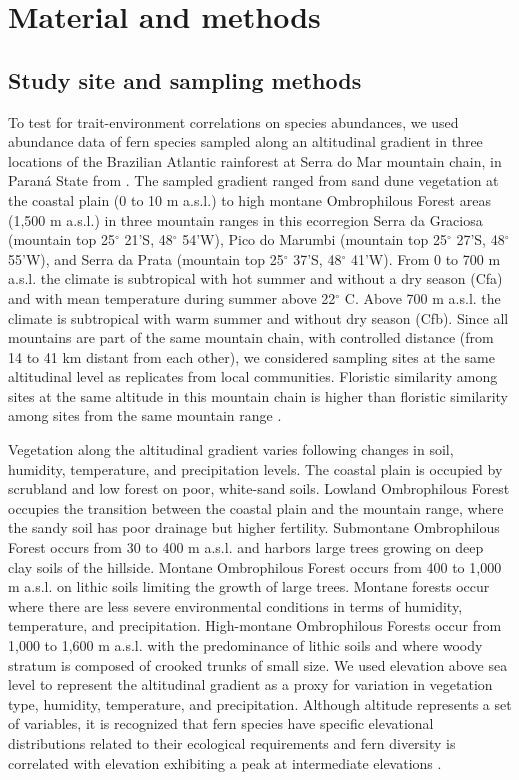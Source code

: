 \documentclass[12pt]{article}
\begin{document}
\section*{Material and methods}

\subsection*{Study site and sampling methods}
To test for trait-environment correlations on species
abundances, we used abundance data of fern species sampled along an
altitudinal gradient in three locations of the Brazilian Atlantic
rainforest at Serra do Mar mountain chain, in Paran\'a State from
\cite{Paciencia2008}.  The sampled gradient ranged from sand dune
vegetation at the coastal plain (0 to 10 m a.s.l.) to high montane
Ombrophilous Forest areas (1,500 m a.s.l.) in three mountain ranges in
this ecorregion Serra da Graciosa (mountain top 25{$^{\circ}$} 21'S,
48{$^{\circ}$} 54'W), Pico do Marumbi (mountain top 25{$^{\circ}$} 27'S,
48{$^{\circ}$} 55'W), and Serra da Prata (mountain top 25{$^{\circ}$} 37'S,
48{$^{\circ}$} 41'W). From 0 to 700 m a.s.l. the climate is
subtropical with hot summer and without a dry season (Cfa) and with
mean temperature during summer above 22{$^{\circ}$} C. Above 700 m
a.s.l. the climate is subtropical with warm summer and without dry
season (Cfb). Since all mountains are part of the same mountain chain,
with controlled distance (from 14 to 41 km distant from each other),
we considered sampling sites at the same altitudinal level as
replicates from local communities.  Floristic similarity
among sites at the same altitude in this mountain chain is higher than
floristic similarity among sites from the same mountain range
\citep{Paciencia2008}.
 
Vegetation along the altitudinal gradient varies following changes in
soil, humidity, temperature, and precipitation levels.  The coastal
plain is occupied by scrubland and low forest on poor, white-sand
soils.  Lowland Ombrophilous Forest occupies the transition between
the coastal plain and the mountain range, where the sandy soil has
poor drainage but higher fertility.  Submontane Ombrophilous Forest
occurs from 30 to 400 m a.s.l. and harbors large trees growing on deep
clay soils of the hillside. Montane Ombrophilous Forest occurs from
400 to 1,000 m a.s.l. on lithic soils limiting the growth of large
trees. Montane forests occur where there are less severe environmental
conditions in terms of humidity, temperature, and
precipitation. High-montane Ombrophilous Forests occur from 1,000 to
1,600 m a.s.l. with the predominance of lithic soils and where woody
stratum is composed of crooked trunks of small size.  We used
elevation above sea level to represent the altitudinal gradient as a
proxy for variation in vegetation type, humidity, temperature, and
precipitation.  Although altitude represents a set of variables, it is
recognized that fern species have specific elevational distributions
related to their ecological requirements \citep{Mehltreter2010} and
fern diversity is correlated with elevation exhibiting a peak at
intermediate elevations
\citep{Kessler2001,Cardelus2006,WatkinsJr2006, Paciencia2008}.
\end{document}
